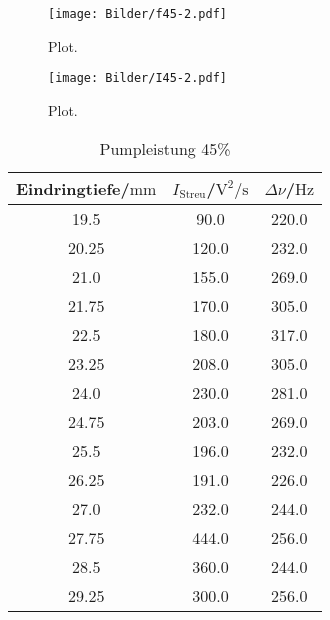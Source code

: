 \begin{figure}
  \centering
  \texttt{[image: Bilder/f45-2.pdf]}
  \caption{Plot.}
  \label{fig:f45}
\end{figure}
\begin{figure}
  \centering
  \texttt{[image: Bilder/I45-2.pdf]}
  \caption{Plot.}
  \label{fig:I45}
\end{figure}
\begin{table}
  \centering
  \caption{Pumpleistung 45\%}
  \label{tab:pl45}
\begin{tabular}{ccc}
  \toprule
Eindringtiefe/$\si{\milli\meter}$ & $I_\mathrm{Streu}$/$\si{\square\volt\per\second}$ & $\Delta \nu$/$\si{\Hz}$ \\
\midrule
19.5 & 90.0 & 220.0 \\
20.25 & 120.0 & 232.0 \\
21.0 & 155.0 & 269.0 \\
21.75 & 170.0 & 305.0 \\
22.5 & 180.0 & 317.0 \\
23.25 & 208.0 & 305.0 \\
24.0 & 230.0 & 281.0 \\
24.75 & 203.0 & 269.0 \\
25.5 & 196.0 & 232.0 \\
26.25 & 191.0 & 226.0 \\
27.0 & 232.0 & 244.0 \\
27.75 & 444.0 & 256.0 \\
28.5 & 360.0 & 244.0 \\
29.25 & 300.0 & 256.0 \\
\bottomrule
\end{tabular}
\end{table}
